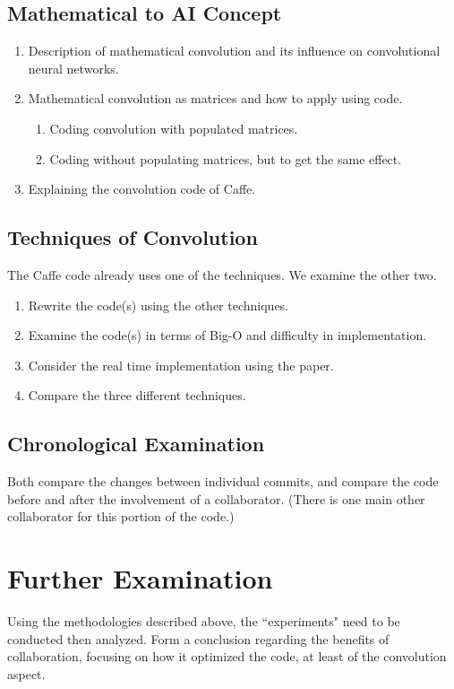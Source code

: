 \documentclass[a4paper]{article}
\begin{document}
\begin{doublespace}
\subsection{Mathematical to AI Concept}
\begin{enumerate}
\item Description of mathematical convolution and its influence on convolutional neural networks.
\item Mathematical convolution as matrices and how to apply using code.
\begin{enumerate}
\item Coding convolution with populated matrices.
\item Coding without populating matrices, but to get the same effect.
\end{enumerate}
\item Explaining the convolution code of Caffe.
\end{enumerate}

\subsection{Techniques of Convolution}
The Caffe code already uses one of the techniques. We examine the other two.
\begin{enumerate}
\item Rewrite the code(s) using the other techniques.
\item Examine the code(s) in terms of Big-O and difficulty in implementation.
\item Consider the real time implementation using the paper.
\item Compare the three different techniques.
\end{enumerate}

\subsection{Chronological Examination}
Both compare the changes between individual commits, and compare the code before and after the involvement of a collaborator. (There is one main other collaborator for this portion of the code.)

\section{Further Examination}
Using the methodologies described above, the ``experiments" need to be conducted then analyzed. Form a conclusion regarding the benefits of collaboration, focusing on how it optimized the code, at least of the convolution aspect.


\end{doublespace}
\end{document}

